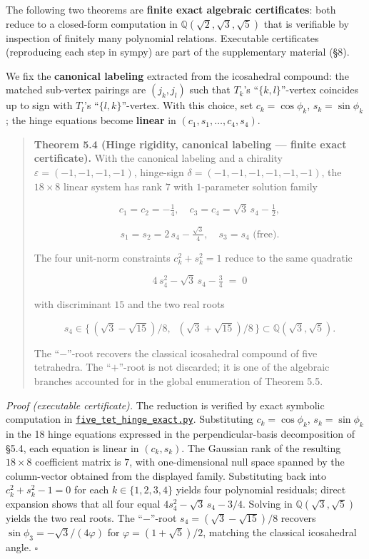 \documentclass[
]{article}
\begin{document}
The following two theorems are \textbf{finite exact algebraic
certificates}: both reduce to a closed-form computation in
\(\mathbb{Q}(\sqrt{2},\sqrt{3},\sqrt{5})\) that is verifiable by
inspection of finitely many polynomial relations. Executable
certificates (reproducing each step in sympy) are part of the
supplementary material (§8).

We fix the \textbf{canonical labeling} extracted from the icosahedral
compound: the matched sub-vertex pairings are \((j_k, j_l)\) such that
\(T_k\)'s ``\(\{k,l\}\)''-vertex coincides up to sign with \(T_l\)'s
``\(\{l,k\}\)''-vertex. With this choice, set \(c_k = \cos\phi_k\),
\(s_k = \sin\phi_k\); the hinge equations become \textbf{linear} in
\((c_1, s_1, \ldots, c_4, s_4)\).

\begin{quote}
\textbf{Theorem 5.4 (Hinge rigidity, canonical labeling --- finite exact
certificate).} With the canonical labeling and a chirality
\(\varepsilon = (-1,-1,-1,-1)\), hinge-sign
\(\delta = (-1,-1,-1,-1,-1,-1)\), the \(18\times 8\) linear system has
rank \(7\) with \(1\)-parameter solution family

\[
c_1 = c_2 = -\tfrac{1}{4},\quad c_3 = c_4 = \sqrt{3}\,s_4 - \tfrac{1}{2},
\]

\[
s_1 = s_2 = 2\,s_4 - \tfrac{\sqrt{3}}{4},\quad s_3 = s_4 \text{ (free)}.
\]

The four unit-norm constraints \(c_k^2 + s_k^2 = 1\) reduce to the same
quadratic

\[
\boxed{\;4\,s_4^2 - \sqrt{3}\,s_4 - \tfrac{3}{4} \;=\; 0\;}
\]

with discriminant \(15\) and the two real roots

\[
s_4 \in \{\, (\sqrt{3} - \sqrt{15})/8,\;\; (\sqrt{3} + \sqrt{15})/8 \,\}
\subset \mathbb{Q}(\sqrt{3}, \sqrt{5}).
\]

The ``\(-\)''-root recovers the classical icosahedral compound of five
tetrahedra. The ``\(+\)''-root is not discarded; it is one of the
algebraic branches accounted for in the global enumeration of Theorem
5.5.
\end{quote}

\emph{Proof (executable certificate).} The reduction is verified by
exact symbolic computation in
\href{../scripts/five_tet_hinge_exact.py}{\texttt{five\_tet\_hinge\_exact.py}}.
Substituting \(c_k = \cos\phi_k\), \(s_k = \sin\phi_k\) in the 18 hinge
equations expressed in the perpendicular-basis decomposition of §5.4,
each equation is linear in \((c_k, s_k)\). The Gaussian rank of the
resulting \(18 \times 8\) coefficient matrix is \(7\), with
one-dimensional null space spanned by the column-vector obtained from
the displayed family. Substituting back into \(c_k^2 + s_k^2 - 1 = 0\)
for each \(k\in\{1,2,3,4\}\) yields four polynomial residuals; direct
expansion shows that all four equal \(4 s_4^2 - \sqrt{3}\,s_4 - 3/4\).
Solving in \(\mathbb{Q}(\sqrt{3}, \sqrt{5})\) yields the two real roots.
The ``\(-\)''-root \(s_4 = (\sqrt{3} - \sqrt{15})/8\) recovers
\(\sin\phi_3 = -\sqrt{3}/(4\varphi)\) for \(\varphi = (1+\sqrt{5})/2\),
matching the classical icosahedral angle. \(\square\)
\end{document}
